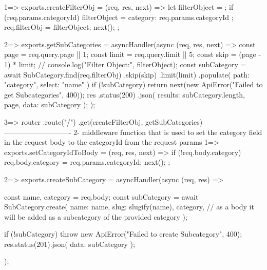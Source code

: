                     1=> exports.createFilterObj = (req, res, next) => {
                            let filterObject = {};
                            if (req.params.categoryId) {
                                filterObject = { category: req.params.categoryId };
                            }
                            req.filterObj = filterObject;
                            next();
                        };

                        2=> exports.getSubCategories = asyncHandler(async (req, res, next) => {
                                const page = req.query.page || 1;
                                const limit = req.query.limit || 5;
                                const skip = (page - 1) * limit;
                                // console.log("Filter Object:", filterObject);
                                const subCategory = await SubCategory.find(req.filterObj)
                                    .skip(skip)
                                    .limit(limit)
                                    .populate({ path: "category", select: "name" })
                                    if (!subCategory) {
                                            return next(new ApiError("Failed to get Subcategories", 400));
                                        }
                                        res
                                            .status(200)
                                            .json({ results: subCategory.length, page, data: subCategory });
                             });

                             3=> router
                                    .route("/")
                                    .get(createFilterObj, getSubCategories)
                ----------------------------
                2- middleware function that is used to set the category field in the request body to the categoryId from the request params
                    1=> 
                        exports.setCategoryIdToBody = (req, res, next) => {
                            if (!req.body.category) {
                                req.body.category = req.params.categoryId;
                            }
                            next();
                        };

                    2=> 
                        exports.createSubCategory = asyncHandler(async (req, res) => {
                                const { name, category } = req.body;
                                const subCategory = await SubCategory.create({
                                    name: name,
                                    slug: slugify(name),
                                    category, //  as a body it will be added as a subcategory of the provided category
                                });

                                if (!subCategory) {
                                    throw new ApiError("Failed to create Subcategory", 400);
                                }
                                res.status(201).json({ data: subCategory });
                                });


